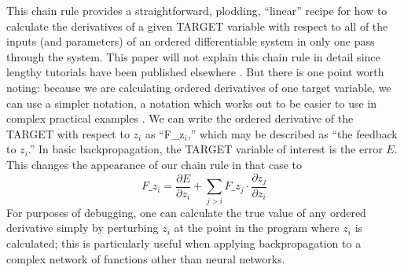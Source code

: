 \documentclass[journal]{IEEEtran} %
\begin{document}
This chain rule provides a straightforward, plodding, ``linear'' recipe for how to calculate the derivatives of a given TARGET variable with respect to all of the inputs (and parameters) of an ordered differentiable system in only one pass through the system. This paper will not explain this chain rule in detail since lengthy tutorials have been published elsewhere \cite{Werbos:1974, Werbos:1987b}. But there is one point worth noting: because we are calculating ordered derivatives of one target variable, we can use a simpler notation, a notation which works out to be easier to use in complex practical examples \cite{Werbos:1987b}. We can write the ordered derivative of the TARGET with respect to $z_i$ as ``F\_z$_i$,'' which may be described as ``the feedback to $z_i$.'' In basic backpropagation, the TARGET variable of interest is the error $E$. This changes the appearance of our chain rule in that case to
\begin{equation}
    F\_z_i = \frac{\partial E}{\partial z_i} + \sum_{j>i} F\_z_j \cdot \frac{\partial z_j}{\partial z_i} \label{eq:feedback_notation}
\end{equation}
For purposes of debugging, one can calculate the true value of any ordered derivative simply by perturbing $z_i$ at the point in the program where $z_i$ is calculated; this is particularly useful when applying backpropagation to a complex network of functions other than neural networks.
\end{document}
